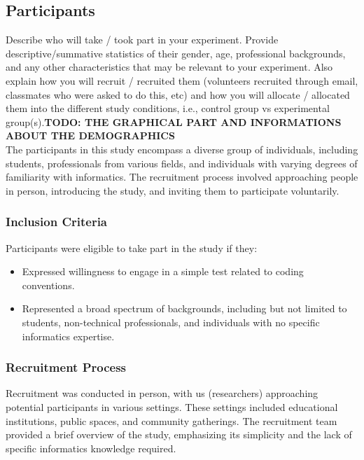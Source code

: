 \documentclass{article}
\begin{document}
\subsection{Participants}
Describe who will take / took part in your experiment. Provide descriptive/summative statistics of their gender, age, professional backgrounds, and any other characteristics that may be relevant to your experiment. Also explain how you will recruit / recruited them (volunteers recruited through email, classmates who were asked to do this, etc) and how you will allocate / allocated them into the different study conditions, i.e., control group vs experimental group(s).\textbf{TODO: THE GRAPHICAL PART AND INFORMATIONS ABOUT THE DEMOGRAPHICS}\\

The participants in this study encompass a diverse group of individuals, including students, professionals from various fields, and individuals with varying degrees of familiarity with informatics. The recruitment process involved approaching people in person, introducing the study, and inviting them to participate voluntarily.

\subsubsection*{Inclusion Criteria}

Participants were eligible to take part in the study if they:
\begin{itemize}
  \item Expressed willingness to engage in a simple test related to coding conventions.
  \item Represented a broad spectrum of backgrounds, including but not limited to students, non-technical professionals, and individuals with no specific informatics expertise.
\end{itemize}

\subsubsection*{Recruitment Process}

Recruitment was conducted in person, with us (researchers) approaching potential participants in various settings. These settings included educational institutions, public spaces, and community gatherings. The recruitment team provided a brief overview of the study, emphasizing its simplicity and the lack of specific informatics knowledge required.
\end{document}
